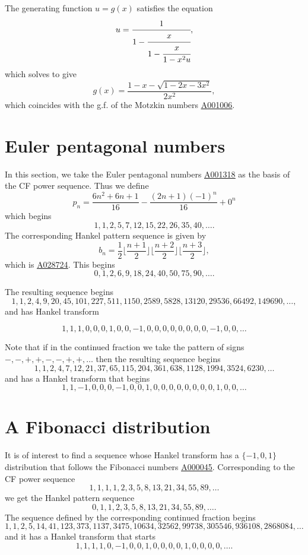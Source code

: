 \documentclass[12pt,reqno]{article}
\theoremstyle{definition}
\newcommand{\seqnum}[1]{\href{http://oeis.org/#1}{\underline{#1}}}
\begin{document}
The generating function $u=g(x)$ satisfies the equation
$$u=\cfrac{1}{1-\cfrac{x}{1-\cfrac{x}{1-x^2 u}}},$$ which solves to give
$$g(x)=\frac{1-x-\sqrt{1-2x-3x^2}}{2x^2},$$ which coincides with the g.f. of the Motzkin numbers \seqnum{A001006}.
\section{Euler pentagonal numbers}
In this section, we take the Euler pentagonal numbers \seqnum{A001318} \cite{Somos} as the basis of the CF power sequence. Thus we define
$$p_n=\frac{6n^2+6n+1}{16}-\frac{(2n+1)(-1)^n}{16}+0^n$$ which begins
$$1, 1, 2, 5, 7, 12, 15, 22, 26, 35, 40,\ldots.$$ The corresponding Hankel pattern sequence is given by
$$b_n = \frac{1}{2}\lfloor \frac{n+1}{2} \rfloor \lfloor \frac{n+2}{2} \rfloor \lfloor \frac{n+3}{2} \rfloor,$$ which is
\seqnum{A028724}. This begins
$$0, 1, 2, 6, 9, 18, 24, 40, 50, 75, 90,\ldots .$$

The resulting sequence begins
$$1, 1, 2, 4, 9, 20, 45, 101, 227, 511, 1150, 2589, 5828, 13120, 29536, 66492, 149690,\ldots,$$ and has Hankel transform

$$1, 1, 1, 0, 0, 0, 1, 0, 0, -1, 0, 0, 0, 0, 0, 0, 0, 0, -1, 0, 0, \ldots$$

Note that if in the continued fraction we take the pattern of signs $-,-,+,+,-,-,+,+,\ldots$ then the resulting sequence begins
$$1, 1, 2, 4, 7, 12, 21, 37, 65, 115, 204, 361, 638, 1128, 1994, 3524, 6230, \ldots$$ and has a Hankel transform that begins
$$1, 1, -1, 0, 0, 0, -1, 0, 0, 1, 0, 0, 0, 0, 0, 0, 0, 0, 1, 0, 0,\ldots $$

\section{A Fibonacci distribution}
It is of interest to find a sequence whose Hankel transform has a $\{-1,0,1\}$ distribution that follows the Fibonacci numbers \seqnum{A000045}. Corresponding to the CF power sequence
$$1,1,1,1,2,3,5,8,13,21,34,55,89,\ldots $$ we get the Hankel pattern sequence
$$0,1,1,2,3,5,8,13,21,34,55,89,\ldots.$$
The sequence defined by the corresponding continued fraction begins
$$1, 1, 2, 5, 14, 41, 123, 373, 1137, 3475, 10634, 32562, 99738, 305546, 936108, 2868084,\ldots$$
and it has a Hankel transform that starts
$$1, 1, 1, 1, 0, -1, 0, 0, 1, 0, 0, 0, 0, 1, 0, 0, 0, 0, \ldots.$$
\end{document}
